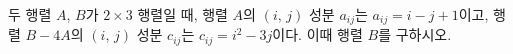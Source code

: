 두 행렬 $A$, $B$가 $2\times 3$ 행렬일 때, 행렬 $A$의 $(i,\,j)$ 성분 $a_{ij}$는 $a_{ij}=i-j+1$이고, 행렬 $B-4A$의 $(i,\,j)$ 성분 $c_{ij}$는 $c_{ij}=i^2-3j$이다. 이때 행렬 $B$를 구하시오.

